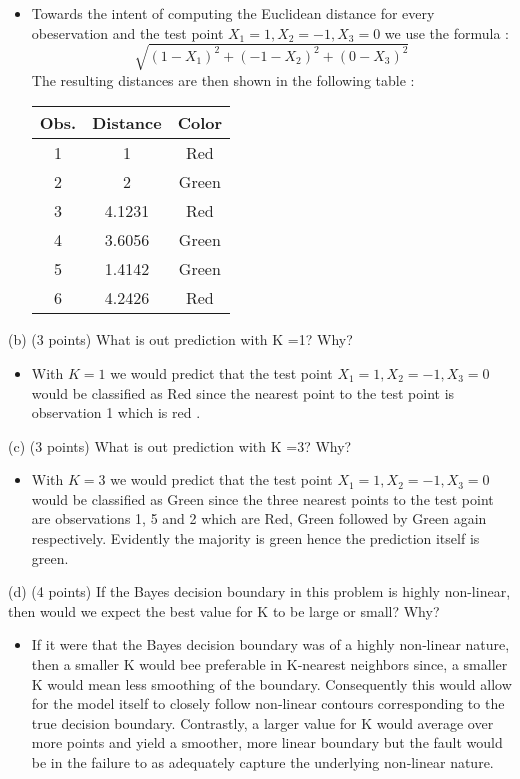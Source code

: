 \documentclass[
]{article}
\begin{document}
\begin{enumerate}
\begin{itemize}
\item Towards the intent of computing the Euclidean distance for every obeservation and the test point $X_1=1, X_2=-1, X_3=0$ we use the formula :
$$
\sqrt{(1 - X_1)^2 + (-1 - X_2)^2 + (0 - X_3)^2}
$$
The resulting distances are then shown in the following table :


\begin{center} 
\begin{tabular}{|c|c|c|} 
\hline \textbf{Obs.} & \textbf{Distance} & \textbf{Color} \\ 
\hline 1 & 1 & Red \\ 
\hline 2 & 2 & Green \\ 
\hline 3 & 4.1231 & Red \\ 
\hline 4 & 3.6056 & Green \\ 
\hline 5 & 1.4142 & Green \\ 
\hline 6 & 4.2426 & Red \\ 
\hline 
\end{tabular} 
\end{center} 

\end{itemize}
(b) (3 points) What is out prediction with K =1? Why?
\begin{itemize}
\item With $K = 1$ we would predict that the test point $X_1 = 1, X_2 = -1, X_3 = 0$ would be classified as Red since the nearest point to the test point is observation 1 which is red .
\end{itemize}
(c) (3 points) What is out prediction with K =3? Why?
\begin {itemize}
\item With $K = 3$ we would predict that the test point $X_1 = 1, X_2 = -1, X_3 = 0$ would be classified as Green since the three nearest points to the test point are observations 1, 5 and 2 which are Red, Green followed by Green again respectively. Evidently the majority is green hence the prediction itself is green.
\end{itemize}
(d) (4 points) If the Bayes decision boundary in this problem is highly non-linear, then would we expect the best value for K to be large or small? Why?
\begin{itemize}
\item  If it were that the Bayes decision boundary was of a highly non‐linear nature, then a smaller K would bee preferable in K‐nearest neighbors since, a smaller K would mean less smoothing of the boundary. Consequently this would allow for the model itself to closely follow non‐linear contours corresponding to the true decision boundary. Contrastly, a larger value for K would average over more points and yield a smoother, more linear boundary but the fault would be in the failure to as adequately capture the underlying non‐linear nature.
\end{itemize}



\end{enumerate}
\end{document}
